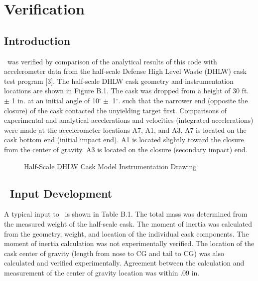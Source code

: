 \chapter{Verification}

\section{Introduction}

     \SLAP\ was verified by comparison of the analytical
results of this code with accelerometer data from the half-scale
Defense High Level Waste (DHLW)
cask test program [3].  The half-scale DHLW cask geometry and
instrumentation locations are shown in Figure B.1.
The cask was dropped
from a height of 30 ft. $\pm$ 1 in. at an initial angle of 10$^\circ
\pm$ 1$^\circ$. such that the narrower end (opposite the closure) of
the cask contacted the unyielding target first.  Comparisons of
experimental and analytical accelerations and velocities (integrated
accelerations) were made at the accelerometer locations A7, A1, and
A3.  A7 is located on the cask bottom end (initial impact end).  A1 is
located slightly toward the closure from the center of gravity.  A3 is
located on the closure (secondary impact) end.

\begin{figure}
\vspace{3.5 in}
\caption{Half-Scale DHLW Cask Model Instrumentation Drawing}
\end{figure}

\section{\SLAP\ Input Development}

      A typical input to \SLAP\ is shown in Table B.1.  The total
mass was determined from the measured weight of the half-scale cask.
The moment of inertia was calculated from the geometry, weight, and
location of the individual cask components.  The moment of inertia
calculation was not experimentally verified.  The location of the cask
center of gravity (length from nose to CG and tail to CG) was also
calculated and verified experimentally.  Agreement between the
calculation and measurement of the center of gravity location was
within .09 in.

